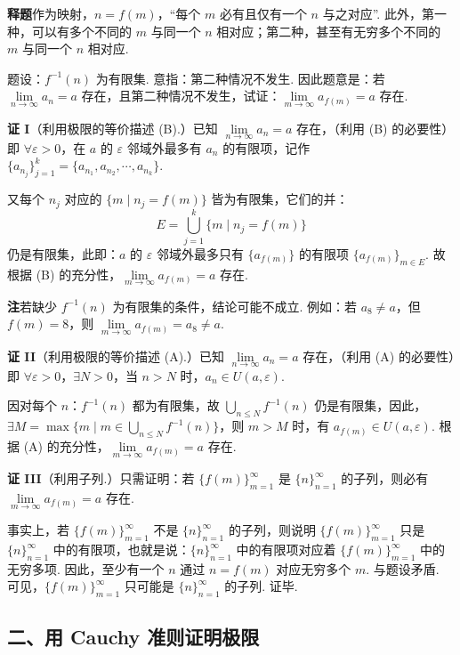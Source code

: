 \documentclass[UTF8,12pt,a4paper,fontset=fandol]{ctexart}
\begin{document}
\noindent\textbf{释题}\quad 作为映射，$n=f(m)$，“每个 $m$ 必有且仅有一个 $n$ 与之对应”. 此外，第一种，可以有多个不同的 $m$ 与同一个 $n$ 相对应；第二种，甚至有无穷多个不同的 $m$ 与同一个 $n$ 相对应.

题设：$f^{-1}(n)$ 为有限集. 意指：第二种情况不发生. 因此题意是：若 $\lim\limits_{n\to\infty}a_n=a$ 存在，且第二种情况不发生，试证：$\lim\limits_{m\to\infty}a_{f(m)}=a$ 存在.

\noindent\textbf{证 I}\quad （利用极限的等价描述 (B).）已知 $\lim\limits_{n\to\infty}a_n=a$ 存在，（利用 (B) 的必要性）即 $\forall\varepsilon>0$，在 $a$ 的 $\varepsilon$ 邻域外最多有 $a_n$ 的有限项，记作 $\{a_{n_j}\}_{j=1}^k=\{a_{n_1},a_{n_2},\cdots,a_{n_k}\}$.

又每个 $n_j$ 对应的 $\{m\mid n_j=f(m)\}$ 皆为有限集，它们的并：
\[
E=\bigcup_{j=1}^k\{m\mid n_j=f(m)\}
\]
仍是有限集，此即：$a$ 的 $\varepsilon$ 邻域外最多只有 $\{a_{f(m)}\}$ 的有限项 $\{a_{f(m)}\}_{m\in E}$. 故根据 (B) 的充分性，$\lim\limits_{m\to\infty}a_{f(m)}=a$ 存在.

\noindent\textbf{注}\quad 若缺少 $f^{-1}(n)$ 为有限集的条件，结论可能不成立. 例如：若 $a_8\ne a$，但 $f(m)=8$，则 $\lim\limits_{m\to\infty}a_{f(m)}=a_8\ne a$.

\noindent\textbf{证 II}\quad （利用极限的等价描述 (A).）已知 $\lim\limits_{n\to\infty}a_n=a$ 存在，（利用 (A) 的必要性）即 $\forall\varepsilon>0$，$\exists N>0$，当 $n>N$ 时，$a_n\in U(a,\varepsilon)$.

因对每个 $n$：$f^{-1}(n)$ 都为有限集，故 $\bigcup\limits_{n\le N}f^{-1}(n)$ 仍是有限集，因此，$\exists M=\max\{m\mid m\in \bigcup\limits_{n\le N}f^{-1}(n)\}$，则 $m>M$ 时，有 $a_{f(m)}\in U(a,\varepsilon)$. 根据 (A) 的充分性，$\lim\limits_{m\to\infty}a_{f(m)}=a$ 存在.

\noindent\textbf{证 III}\quad （利用子列.）只需证明：若 $\{f(m)\}_{m=1}^\infty$ 是 $\{n\}_{n=1}^\infty$ 的子列，则必有 $\lim\limits_{m\to\infty}a_{f(m)}=a$ 存在.

事实上，若 $\{f(m)\}_{m=1}^\infty$ 不是 $\{n\}_{n=1}^\infty$ 的子列，则说明 $\{f(m)\}_{m=1}^\infty$ 只是 $\{n\}_{n=1}^\infty$ 中的有限项，也就是说：$\{n\}_{n=1}^\infty$ 中的有限项对应着 $\{f(m)\}_{m=1}^\infty$ 中的无穷多项. 因此，至少有一个 $n$ 通过 $n=f(m)$ 对应无穷多个 $m$. 与题设矛盾. 可见，$\{f(m)\}_{m=1}^\infty$ 只可能是 $\{n\}_{n=1}^\infty$ 的子列. 证毕.

\subsection*{二、用 Cauchy 准则证明极限}
\end{document}
